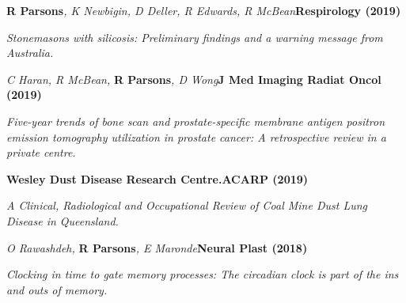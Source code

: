 \item
    \textbf{R Parsons}\textit{, K Newbigin, D Deller, R Edwards, R McBean}\textbf{\hfill Respirology (2019)}\par 
    \textit{Stonemasons with silicosis: Preliminary findings and a warning message from Australia.}
\item
    \textit{C Haran, R McBean, }\textbf{R Parsons}\textit{, D Wong}\textbf{\hfill J Med Imaging Radiat Oncol (2019)}\par 
    \textit{Five-year trends of bone scan and prostate-specific membrane antigen positron emission tomography utilization in prostate cancer: A retrospective review in a private centre.}
\item
    \textbf{Wesley Dust Disease Research Centre.}\textbf{\hfill ACARP (2019)}\par 
    \textit{A Clinical, Radiological and Occupational Review of Coal Mine Dust Lung Disease in Queensland.}
\item
    \textit{O Rawashdeh, }\textbf{R Parsons}\textit{, E Maronde}\textbf{\hfill Neural Plast (2018)}\par 
    \textit{Clocking in time to gate memory processes: The circadian clock is part of the ins and outs of memory.}

